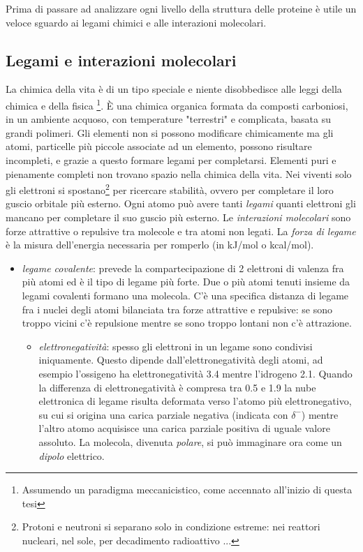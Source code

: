 {Prima di passare ad analizzare ogni livello della struttura delle proteine è utile un veloce sguardo ai legami chimici e  alle interazioni molecolari.

\subsection{Legami e interazioni molecolari} \label{sec:legami-chimici}
{
	La chimica della vita è di un tipo speciale e niente disobbedisce alle leggi della chimica e della fisica \footnote{Assumendo un paradigma meccanicistico, come accennato all'inizio di questa tesi}. È una chimica organica formata da composti carboniosi, in un ambiente acquoso, con temperature "terrestri" e complicata, basata su grandi polimeri. Gli elementi non si possono modificare chimicamente ma gli atomi, particelle più piccole associate ad un elemento, possono risultare incompleti, e grazie a questo formare legami per completarsi. Elementi puri e pienamente completi non trovano spazio nella chimica della vita. Nei viventi solo gli elettroni si spostano\footnote{Protoni e neutroni si separano solo in condizione estreme: nei reattori nucleari, nel sole, per decadimento radioattivo ...} per ricercare stabilità, ovvero per completare il loro guscio orbitale più esterno. Ogni atomo può avere tanti \textit{legami} quanti elettroni gli mancano per completare il suo guscio più esterno.	Le \textit{interazioni molecolari }sono forze attrattive o repulsive tra molecole e tra atomi
	non legati. La \textit{forza di legame} è la misura dell'energia necessaria per romperlo (in kJ/mol o kcal/mol).
		
\begin{itemize}
	\item \textit{legame covalente}: prevede la compartecipazione di 2 elettroni di valenza fra più atomi ed è il tipo di legame più forte. Due o più atomi tenuti insieme da legami covalenti formano una molecola. C'è una specifica distanza di legame fra i nuclei degli atomi bilanciata tra forze attrattive e repulsive: se sono troppo vicini c'è repulsione mentre se sono troppo lontani non c'è attrazione.
		\begin{itemize}
			\item \textit{elettronegatività}: spesso gli elettroni in un legame sono condivisi iniquamente. Questo dipende dall'elettronegatività degli atomi, ad esempio l'ossigeno ha elettronegatività 3.4 mentre l'idrogeno 2.1. Quando la differenza di elettronegatività è compresa tra 0.5 e 1.9 la nube elettronica di legame risulta deformata verso l'atomo più elettronegativo, su cui si origina una carica parziale negativa (indicata con $\delta^{-}$) mentre l'altro atomo acquisisce una carica parziale positiva di uguale valore assoluto. La molecola, divenuta \textit{polare}, si può immaginare ora come un \textit{dipolo }elettrico.


\end{itemize}
\end{itemize}}}
